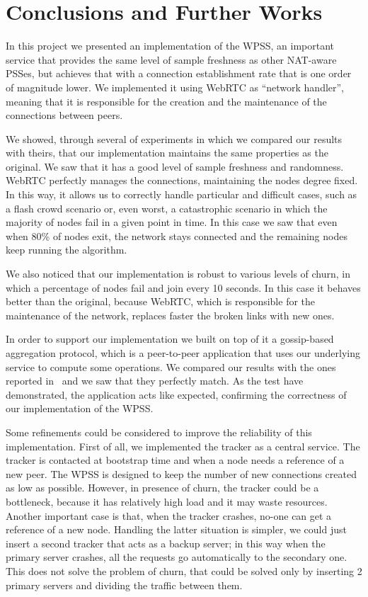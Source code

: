
\chapter{Conclusions and Further Works}
\label{cha:conclusions}
In this project we presented an implementation of the \ac{WPSS}, an important service that provides the same level of sample freshness as other NAT-aware PSSes, but achieves that with a connection establishment rate that is one order of magnitude lower. We implemented it using WebRTC as ``network handler'', meaning that it is responsible for the creation and the maintenance of the connections between peers.

We showed, through several of experiments in which we compared our results with theirs, that our implementation maintains the same properties as the original. We saw that it has a good level of sample freshness and randomness. WebRTC perfectly manages the connections, maintaining the nodes degree fixed. In this way, it allows us to correctly handle particular and difficult cases, such as a flash crowd scenario or, even worst, a catastrophic scenario in which the majority of nodes fail in a given point in time. In this case we saw that even when 80\% of nodes exit, the network stays connected and the remaining nodes keep running the algorithm. 

We also noticed that our implementation is robust to various levels of churn, in which a percentage of nodes fail and join every 10 seconds. In this case it behaves better than the original, because WebRTC, which is responsible for the maintenance of the network, replaces faster the broken links with new ones. 

In order to support our implementation we built on top of it a gossip-based aggregation protocol, which is a peer-to-peer application that uses our underlying service to compute some operations. We compared our results with the ones reported in~\cite{aggregation} and we saw that they perfectly match. As the test have demonstrated, the application acts like expected, confirming the correctness of our implementation of the \ac{WPSS}. 

Some refinements could be considered to improve the reliability of this implementation. First of all, we implemented the tracker as a central service. The tracker is contacted at bootstrap time and when a node needs a reference of a new peer. The \ac{WPSS} is designed to keep the number of new connections created as low as possible. However, in presence of churn, the tracker could be a bottleneck, because it has relatively high load and it may waste resources. Another important case is that, when the tracker crashes, no-one can get a reference of a new node. Handling the latter situation is simpler, we could just insert a second tracker that acts as a backup server; in this way when the primary server crashes, all the requests go automatically to the secondary one. This does not solve the problem of churn, that could be solved only by inserting 2 primary servers and dividing the traffic between them. 

